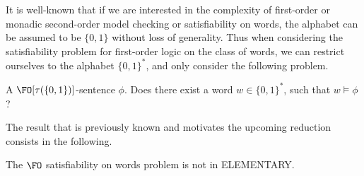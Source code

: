 

It is well-known that if we are interested in the complexity of first-order or monadic
second-order model checking or satisfiability on words, the alphabet can be assumed to be $\{0,1\}$ without loss of generality. 
Thus when considering the satisfiability problem for first-order logic on the class of words, we can restrict ourselves to the alphabet $\{ 0,1\}^*$, and only consider the following problem.



\begin{samepage}
{A  
$\FO[\tau(\{0,1\})]$-sentence $\phi$.}
{Does there exist a word $w\in \{0, 1\}^*$, such that $w \models \phi$ ?\newline}
\end{samepage}





The result that is previously known and motivates the upcoming reduction consists in the following.


\begin{theorem}{\cite{Sto74}}\label{FOnonelementary}



The {\sc $\FO$ satisfiability on words} problem is not in {\sf ELEMENTARY}.
\end{theorem}







